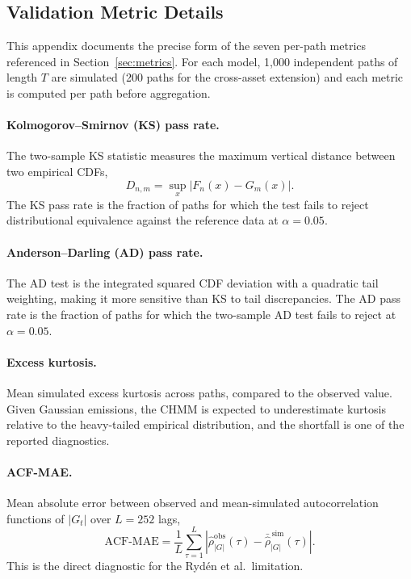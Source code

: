 \subsection{Validation Metric Details}
\label{sec:metric_details}

This appendix documents the precise form of the seven per-path metrics referenced in Section~\ref{sec:metrics}.
For each model, 1{,}000 independent paths of length $T$ are simulated (200 paths for the cross-asset extension) and each metric is computed per path before aggregation.

\paragraph{Kolmogorov--Smirnov (KS) pass rate.}
The two-sample KS statistic \cite{kolmogorov1933, smirnov1948} measures the maximum vertical distance between two empirical CDFs,
\begin{equation}
    D_{n,m} = \sup_x |F_n(x) - G_m(x)|.
    \label{eq:ks}
\end{equation}
The KS pass rate is the fraction of paths for which the test fails to reject distributional equivalence against the reference data at $\alpha = 0.05$.

\paragraph{Anderson--Darling (AD) pass rate.}
The AD test is the integrated squared CDF deviation with a quadratic tail weighting, making it more sensitive than KS to tail discrepancies.
The AD pass rate is the fraction of paths for which the two-sample AD test fails to reject at $\alpha = 0.05$.

\paragraph{Excess kurtosis.}
Mean simulated excess kurtosis across paths, compared to the observed value.
Given Gaussian emissions, the CHMM is expected to underestimate kurtosis relative to the heavy-tailed empirical distribution, and the shortfall is one of the reported diagnostics.

\paragraph{ACF-MAE.}
Mean absolute error between observed and mean-simulated autocorrelation functions of $|G_t|$ over $L = 252$ lags,
\begin{equation}
    \text{ACF-MAE} = \frac{1}{L}\sum_{\tau=1}^{L} \left| \hat\rho^{\text{obs}}_{|G|}(\tau) - \bar{\hat\rho}^{\,\text{sim}}_{|G|}(\tau) \right|.
    \label{eq:acf_mae_supp}
\end{equation}
This is the direct diagnostic for the Ryd\'{e}n et al.\ limitation.

